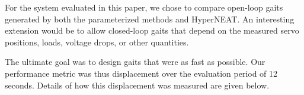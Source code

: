 
For the system evaluated in this paper, we chose to compare open-loop gaits generated by both the parameterized methods and
HyperNEAT.  An interesting extension would be to allow closed-loop gaits that depend
on the measured servo positions, loads, voltage drops, or other
quantities.

The ultimate goal was to design gaits that were as fast as possible.
Our performance metric was thus displacement over
the evaluation period of 12 seconds. Details of
how this displacement was measured are given below.
